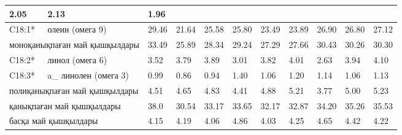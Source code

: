 \begin{table}[]
{\begin{tabular}{|ll|lll|lll|lll|}
    \multicolumn{1}{l|}{2.05} &
    \multicolumn{1}{l|}{2.13} &
    1.96 \\ \hline
  \multicolumn{1}{|l|}{C18:1*} &
    олеин (омега 9) &
    \multicolumn{1}{l|}{29.46} &
    \multicolumn{1}{l|}{21.64} &
    25.58 &
    \multicolumn{1}{l|}{25.80} &
    \multicolumn{1}{l|}{23.49} &
    23.89 &
    \multicolumn{1}{l|}{26.90} &
    \multicolumn{1}{l|}{26.80} &
    27.12 \\ \hline
  \multicolumn{2}{|l|}{моноқанықпаған май қышқылдары} &
    \multicolumn{1}{l|}{33.49} &
    \multicolumn{1}{l|}{25.89} &
    28.34 &
    \multicolumn{1}{l|}{29.24} &
    \multicolumn{1}{l|}{27.29} &
    27.66 &
    \multicolumn{1}{l|}{30.43} &
    \multicolumn{1}{l|}{30.26} &
    30.30 \\ \hline
  \multicolumn{1}{|l|}{C18:2*} &
    линол (омега 6) &
    \multicolumn{1}{l|}{3.52} &
    \multicolumn{1}{l|}{3.79} &
    3.89 &
    \multicolumn{1}{l|}{3.01} &
    \multicolumn{1}{l|}{3.82} &
    4.01 &
    \multicolumn{1}{l|}{2.63} &
    \multicolumn{1}{l|}{3.94} &
    4.10 \\ \hline
  \multicolumn{1}{|l|}{C18:3*} &
    a\_ линолен (омега 3) &
    \multicolumn{1}{l|}{0.99} &
    \multicolumn{1}{l|}{0.86} &
    0.94 &
    \multicolumn{1}{l|}{1.40} &
    \multicolumn{1}{l|}{1.06} &
    1.20 &
    \multicolumn{1}{l|}{1.14} &
    \multicolumn{1}{l|}{1.06} &
    1.13 \\ \hline
  \multicolumn{2}{|l|}{полиқанықпаған май қышқылдары} &
    \multicolumn{1}{l|}{4.51} &
    \multicolumn{1}{l|}{4.65} &
    4.83 &
    \multicolumn{1}{l|}{4.41} &
    \multicolumn{1}{l|}{4.88} &
    5.21 &
    \multicolumn{1}{l|}{3.77} &
    \multicolumn{1}{l|}{5.00} &
    5.23 \\ \hline
  \multicolumn{2}{|l|}{қанықпаған май қышқылдары} &
    \multicolumn{1}{l|}{38.0} &
    \multicolumn{1}{l|}{30.54} &
    33.17 &
    \multicolumn{1}{l|}{33.65} &
    \multicolumn{1}{l|}{32.17} &
    32.87 &
    \multicolumn{1}{l|}{34.20} &
    \multicolumn{1}{l|}{35.26} &
    35.53 \\ \hline
  \multicolumn{2}{|l|}{басқа май қышқылдары} &
    \multicolumn{1}{l|}{4.15} &
    \multicolumn{1}{l|}{4.19} &
    4.06 &
    \multicolumn{1}{l|}{4.86} &
    \multicolumn{1}{l|}{4.03} &
    4.25 &
    \multicolumn{1}{l|}{4.65} &
    \multicolumn{1}{l|}{4.42} &
    4.22 \\ \hline
  \end{tabular}
  }
  \end{table}
  


